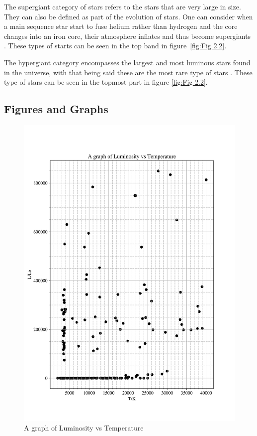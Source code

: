 \documentclass[12pt, a4paper]{article}
\begin{document}
The supergiant category of stars refers to the stars that are very large in size. They can also be defined as part of the evolution of stars. One can consider when a main sequence star start to fuse helium rather than hydrogen and the core changes into an iron core, their atmosphere inflates and thus become supergiants \parencite{jaschek1990classification}. These types of starts can be seen in the top band in figure~\ref{fig:Fig 2.2}.

The hypergiant category encompasses the largest and most luminous stars found in the universe, with that being said these are the most rare type of stars \parencite{jaschek1990classification}. These type of stars can be seen in the topmost part in figure \ref{fig:Fig 2.2}.

\subsection{Figures and Graphs}
\begin{figure}[H]
    \centering
    \includegraphics[width = \textwidth]{2Plot1.png}
    \caption{A graph of Luminosity vs Temperature}
    \label{fig:Fig 2.1}
\end{figure}
\end{document}
